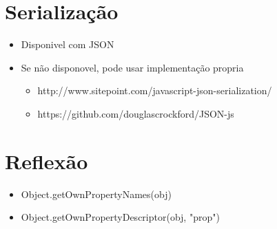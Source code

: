 \documentclass[10pt]{beamer}
\begin{document}
\begin{frame}
	
\end{frame}

\begin{frame}
	
\end{frame}


\section{Serialização}
\begin{frame}
	\begin{itemize}
		\item Disponivel com JSON
		\item Se não disponovel, pode usar implementação propria
		\begin{itemize}
			\item http://www.sitepoint.com/javascript-json-serialization/
			\item https://github.com/douglascrockford/JSON-js
		\end{itemize}
	\end{itemize}
\end{frame}

\begin{frame}
	
\end{frame}
\begin{frame}
	
\end{frame}


\section{Reflexão}
\begin{frame}
	\begin{itemize}
		\item Object.getOwnPropertyNames(obj)
		\item Object.getOwnPropertyDescriptor(obj, "prop")
	\end{itemize}
\end{frame}

\begin{frame}
	
\end{frame}
\end{document}
